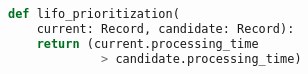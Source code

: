 \begin{lstlisting}[language=Python, caption=Event prioritization example implementing LIFO prioritization., label={lst:prioritization}]
def lifo_prioritization(
    current: Record, candidate: Record):
    return (current.processing_time
             > candidate.processing_time)
\end{lstlisting}